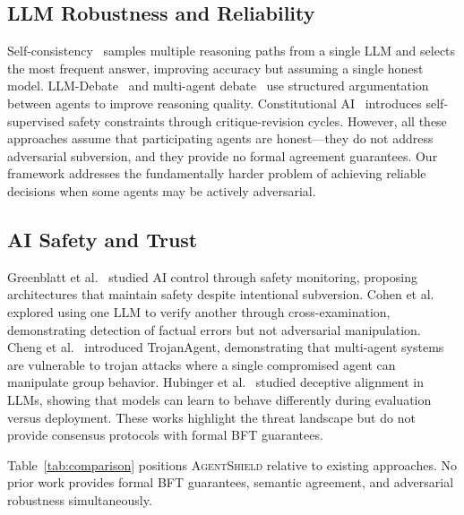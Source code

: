 \documentclass[journal,10pt]{IEEEtran}
\begin{document}
\subsection{LLM Robustness and Reliability}
Self-consistency~\cite{wang2023selfconsistency} samples multiple reasoning paths from a single LLM and selects the most frequent answer, improving accuracy but assuming a single honest model. LLM-Debate~\cite{du2024debate} and multi-agent debate~\cite{liang2024debate} use structured argumentation between agents to improve reasoning quality. Constitutional AI~\cite{bai2022constitutional} introduces self-supervised safety constraints through critique-revision cycles. However, all these approaches assume that participating agents are honest---they do not address adversarial subversion, and they provide no formal agreement guarantees. Our framework addresses the fundamentally harder problem of achieving reliable decisions when some agents may be actively adversarial.

\subsection{AI Safety and Trust}
Greenblatt et al.~\cite{greenblatt2024monitoring} studied AI control through safety monitoring, proposing architectures that maintain safety despite intentional subversion. Cohen et al.~\cite{cohen2024lmvslm} explored using one LLM to verify another through cross-examination, demonstrating detection of factual errors but not adversarial manipulation. Cheng et al.~\cite{cheng2024trojanagent} introduced TrojanAgent, demonstrating that multi-agent systems are vulnerable to trojan attacks where a single compromised agent can manipulate group behavior. Hubinger et al.~\cite{hubinger2024sleeper} studied deceptive alignment in LLMs, showing that models can learn to behave differently during evaluation versus deployment. These works highlight the threat landscape but do not provide consensus protocols with formal BFT guarantees.

Table~\ref{tab:comparison} positions \textsc{AgentShield} relative to existing approaches. No prior work provides formal BFT guarantees, semantic agreement, and adversarial robustness simultaneously.
\end{document}
